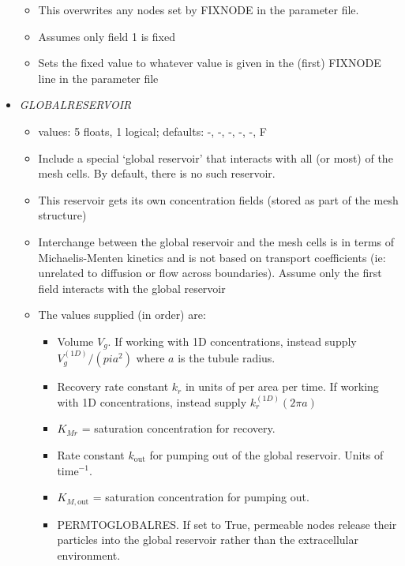 \documentclass[12pt]{article}
\begin{document}
\begin{itemize}
\begin{itemize}
	\item This overwrites any nodes set by FIXNODE in the parameter file. 
	\item Assumes only field 1 is fixed
	\item Sets the fixed value to whatever value is given in the (first) FIXNODE line in the parameter file
\end{itemize}
%
\item {\it GLOBALRESERVOIR}
\begin{itemize}
	\item values: 5 floats, 1 logical; defaults: -, -, -, -, -, F
	\item Include a special `global reservoir' that interacts with all (or most) of the mesh cells. By default, there is no such reservoir.
	\item This reservoir gets its own concentration fields (stored as part of the mesh structure)
	\item Interchange between the global reservoir and the mesh cells is in terms of Michaelis-Menten kinetics and is not based on transport coefficients (ie: unrelated to diffusion or flow across boundaries). Assume only the first field interacts with the global reservoir
	\item The values supplied (in order) are:
	\begin{itemize}
		\item Volume $V_g$. If working with 1D concentrations, instead supply $V_g^{(1D)}/(pi a^2)$ where $a$ is the tubule radius.
		\item Recovery rate constant $k_r$ in units of per area per time. If working with 1D concentrations, instead supply $k_r^{(1D)} (2\pi a)$
		\item $K_{Mr}$ = saturation concentration for recovery. 
		\item Rate constant $k_\text{out}$ for pumping out of the global reservoir. Units of time$^{-1}$.
		\item $K_{M,\text{out}}$ = saturation concentration for pumping out.
		\item PERMTOGLOBALRES. If set to True, permeable nodes release their particles into the global reservoir rather than the extracellular environment.
	\end{itemize}
\end{itemize}

\end{itemize}
\end{document}
